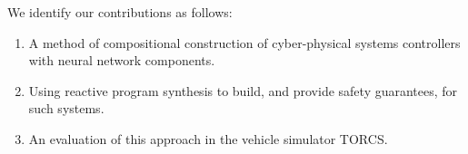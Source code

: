 We identify our contributions as follows:
\begin{enumerate}
\item A method of compositional construction of cyber-physical systems controllers with neural network components.
\item Using reactive program synthesis to build, and provide safety guarantees, for such systems.
\item An evaluation of this approach in the vehicle simulator TORCS.
\end{enumerate}


